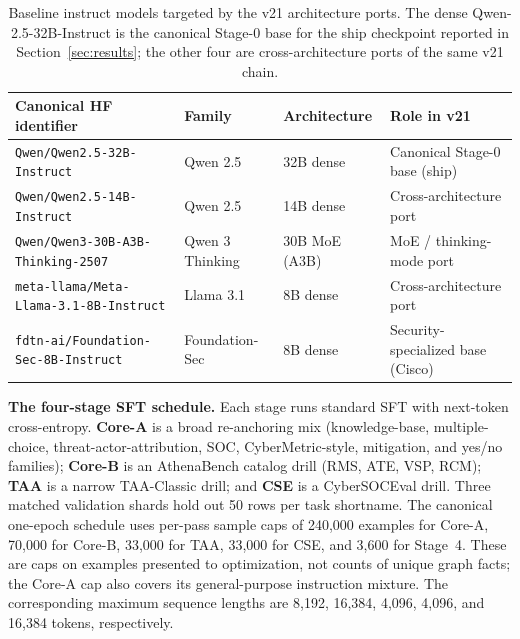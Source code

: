 \documentclass[conference]{IEEEtran}
\providecommand{\hfid}[1]{{\small\nolinkurl{#1}}}
\begin{document}
\begin{table}[t]
\centering
\caption{Baseline instruct models targeted by the v21 architecture ports. The dense Qwen-2.5-32B-Instruct is the canonical Stage-0 base for the ship checkpoint reported in Section~\ref{sec:results}; the other four are cross-architecture ports of the same v21 chain.}
\label{tab:base-models}
\small
\setlength{\tabcolsep}{4pt}
\begin{tabular}{p{4.8cm} l l l}
\hline
\textbf{Canonical HF identifier} & \textbf{Family} & \textbf{Architecture} & \textbf{Role in v21} \\
\hline
\hfid{Qwen/Qwen2.5-32B-Instruct}             & Qwen 2.5             & 32B dense          & Canonical Stage-0 base (ship) \\
\hfid{Qwen/Qwen2.5-14B-Instruct}             & Qwen 2.5             & 14B dense          & Cross-architecture port \\
\hfid{Qwen/Qwen3-30B-A3B-Thinking-2507}      & Qwen 3 Thinking      & 30B MoE (A3B)      & MoE / thinking-mode port \\
\hfid{meta-llama/Meta-Llama-3.1-8B-Instruct} & Llama 3.1            & 8B dense           & Cross-architecture port \\
\hfid{fdtn-ai/Foundation-Sec-8B-Instruct}    & Foundation-Sec       & 8B dense           & Security-specialized base (Cisco) \\
\hline
\end{tabular}
\end{table}

\textbf{The four-stage SFT schedule.} Each stage runs standard SFT with next-token cross-entropy. \textbf{Core-A} is a broad re-anchoring mix (knowledge-base, multiple-choice, threat-actor-attribution, SOC, CyberMetric-style, mitigation, and yes/no families); \textbf{Core-B} is an AthenaBench catalog drill (RMS, ATE, VSP, RCM); \textbf{TAA} is a narrow TAA-Classic drill; and \textbf{CSE} is a CyberSOCEval drill. Three matched validation shards hold out 50 rows per task shortname. The canonical one-epoch schedule uses per-pass sample caps of 240,000 examples for Core-A, 70,000 for Core-B, 33,000 for TAA, 33,000 for CSE, and 3,600 for Stage~4. These are caps on examples presented to optimization, not counts of unique graph facts; the Core-A cap also covers its general-purpose instruction mixture. The corresponding maximum sequence lengths are 8,192, 16,384, 4,096, 4,096, and 16,384 tokens, respectively.
\end{document}
